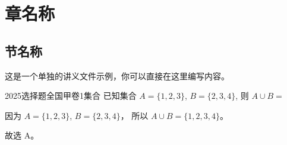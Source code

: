 \documentclass[12pt,UTF-8,a4paper,openany]{ctexbook}
\numberwithin{figure}{section}
\theoremstyle{mystyle}
\theoremstyle{mystylekaishu}
\theoremstyle{mystyle}
\numberwithin{xiti}{section}
\begin{document}
%  
% 
% 
% 

\chapter{章名称}
\section{节名称}

这是一个单独的讲义文件示例，你可以直接在这里编写内容。
\begin{lanbox}
\begin{problem}{2025}{选择题}{全国甲卷}{1}{集合}
已知集合 $A = \{1, 2, 3\}$, $B = \{2, 3, 4\}$, 则 $A \cup B = $
\begin{choices}
    \choice{$\emptyset$}
\end{choices}
\end{problem}
\end{lanbox}

\begin{solutions}
因为 $A = \{1, 2, 3\}$, $B = \{2, 3, 4\}$，
所以 $A \cup B = \{1, 2, 3, 4\}$。

故选 A。
\end{solutions}
\end{document}
